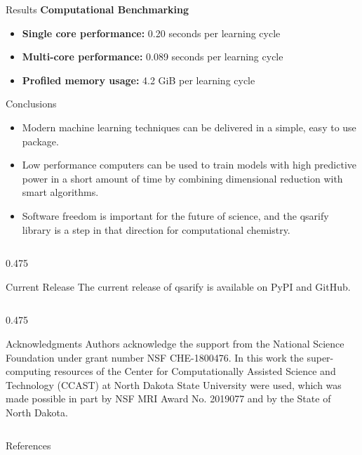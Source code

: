 \documentclass[final]{beamer}
\newlength{\colwidth}
\begin{document}
\begin{frame}[t]
\begin{columns}[t]
\begin{column}{\colwidth}
\begin{block}{Results}
				\large{\bfseries{Computational Benchmarking}} \smallskip
				\begin{itemize}
					\item \textbf{Single core performance:} 0.20 seconds per learning cycle
					\item \textbf{Multi-core performance:} 0.089 seconds per learning cycle
					\item \textbf{Profiled memory usage:} 4.2 GiB per learning cycle
				\end{itemize}

				\end{block}

				\begin{block}{Conclusions}


				\begin{itemize}
					\item \large Modern machine learning techniques can be delivered in a simple, easy to use package.
					\item \large Low performance computers can be used to train models with high predictive power in a short amount of time by combining dimensional reduction with smart algorithms.
					\item \large Software freedom is important for the future of science, and the qsarify library is a step in that direction for computational chemistry.
				\end{itemize}
				\end{block}
				\begin{column}{0.475\colwidth}
				\begin{block}{Current Release}
				\large{The current release of qsarify is available on PyPI and GitHub.}
				\begin{figure}
					\centering
				\end{figure}
				\end{block}
				\end{column}
				\begin{column}{0.475\colwidth}
				\begin{block}{ Acknowledgments}
				 Authors acknowledge the support from the National Science Foundation under grant number NSF CHE-1800476. In this work the super-computing resources of the Center for Computationally Assisted Science and Technology (CCAST) at North Dakota State University were used, which was made possible in part by NSF MRI Award No. 2019077 and by the State of North Dakota.
				\end{block}
			\end{column}
				\begin{block}{References}
					\printbibliography
				\end{block}
			\end{column}
		\end{columns}
	\end{frame}
\end{document}
